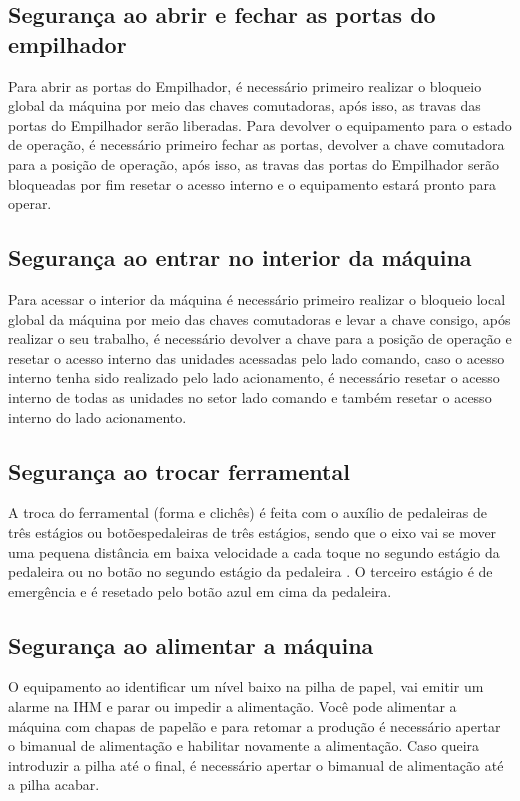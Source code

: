 \subsection{Segurança ao abrir e fechar as portas do empilhador}

Para abrir as portas do Empilhador, é necessário primeiro realizar o bloqueio global da máquina por meio das chaves comutadoras, após isso, as travas das portas do
Empilhador serão liberadas. Para devolver o equipamento para o estado de operação, é necessário primeiro fechar as portas, devolver a chave comutadora para a posição de 
operação, após isso, as travas das portas do Empilhador serão bloqueadas por fim resetar o acesso interno e o equipamento estará pronto para operar.

\newpage
\thispagestyle{fancy}
\vspace*{40 pt}

\fi

\subsection{Segurança ao entrar no interior da máquina}

Para acessar o interior da máquina é necessário primeiro realizar o bloqueio \ifmachineType local \else global \fi da máquina por meio das chaves comutadoras e levar a chave consigo, após realizar o
seu trabalho, é necessário devolver a chave para a posição de operação e resetar o acesso interno das unidades acessadas pelo lado comando, caso o acesso interno tenha
sido realizado pelo lado acionamento, é necessário resetar o acesso interno de todas as unidades no setor lado comando e também resetar o acesso interno do lado acionamento.

\ifmachineType
  \newpage
  \thispagestyle{fancy}
  \vspace*{40 pt}
\fi

\subsection{Segurança ao trocar ferramental}

A troca do ferramental (forma e clichês) é feita com o auxílio de \ifmachineType pedaleiras de três estágios ou botões\else pedaleiras de três estágios\fi, sendo que o 
eixo vai se mover uma pequena distância em baixa velocidade a cada toque \ifmachineType no segundo estágio da pedaleira ou no botão \else no segundo estágio da pedaleira \fi. 
O terceiro estágio é de emergência e é resetado pelo botão azul em cima da pedaleira.


\subsection{Segurança ao alimentar a máquina}

O equipamento ao identificar um nível baixo na pilha de papel, vai emitir um alarme na IHM e parar ou impedir a alimentação. Você pode alimentar a máquina com chapas de papelão
e para retomar a produção é necessário apertar o bimanual de alimentação e habilitar novamente a alimentação. Caso queira introduzir a pilha até o final, é necessário
apertar o bimanual de alimentação até a pilha acabar.

